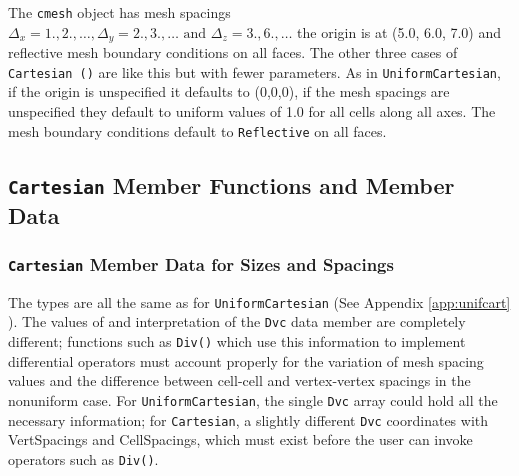 The \texttt{cmesh} object has mesh spacings $\Delta_x = {1.,2., \dots}, \Delta_y = {2.,3., \dots} \text{ and } \Delta_z = {3.,6., \dots}$ the origin is at (5.0, 6.0, 7.0) and reflective mesh boundary conditions on all faces. 
The other three cases of \texttt{Cartesian ()} are like this but with fewer parameters. As in \texttt{UniformCartesian}, if the origin is unspecified it defaults to (0,0,0), 
if the mesh spacings are unspecified they default to uniform values of 1.0 for all cells along all axes. The mesh boundary conditions default to \texttt{Reflective} on all faces. 

\subsection{\texttt{Cartesian} Member Functions and Member Data} 
\subsubsection{ \texttt{Cartesian} Member Data for Sizes and Spacings}
The types are all the same as for \texttt{UniformCartesian} (See Appendix \ref{app:unifcart} ). The values of and interpretation of the \texttt{Dvc} data member are completely different; functions such as \texttt{Div()} which 
use this information to implement differential operators must account properly for the variation of mesh spacing values and the difference between cell-cell and vertex-vertex spacings in the nonuniform case. 
For \texttt{UniformCartesian}, the single \texttt{Dvc} array could hold all the necessary information; for \texttt{Cartesian}, a slightly different \texttt{Dvc} coordinates with VertSpacings and CellSpacings, 
which must exist before the user can invoke operators such as \texttt{Div()}.

